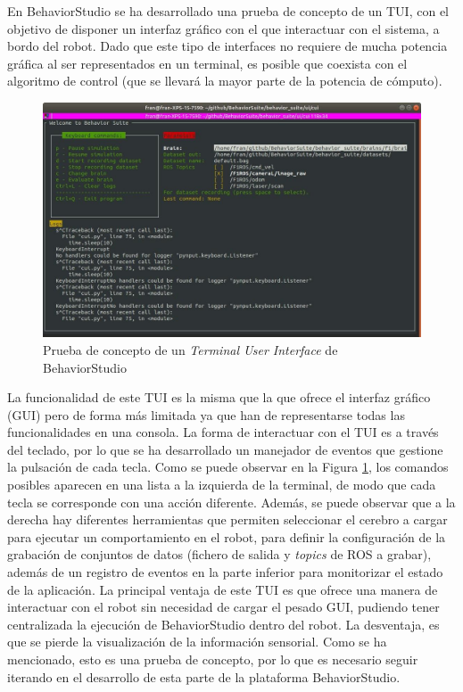 En BehaviorStudio se ha desarrollado una prueba de concepto de un TUI, con el objetivo de disponer un interfaz gráfico con el que interactuar con el sistema, a bordo del robot. Dado que este tipo de interfaces no requiere de mucha potencia gráfica al ser representados en un terminal, es posible que coexista con el algoritmo de control (que se llevará la mayor parte de la potencia de cómputo). 

\begin{figure}
  \centering
  \includegraphics[width=.8\linewidth]{img/tui.jpg}
  \caption{Prueba de concepto de un \textit{Terminal User Interface} de BehaviorStudio}
  \label{fig:tui}
\end{figure}

La funcionalidad de este TUI es la misma que la que ofrece el interfaz gráfico (GUI) pero de forma más limitada ya que han de representarse todas las funcionalidades en una consola. La forma de interactuar con el TUI es a través del teclado, por lo que se ha desarrollado un manejador de eventos que gestione la pulsación de cada tecla. Como se puede observar en la Figura \ref{fig:tui}, los comandos posibles aparecen en una lista a la izquierda de la terminal, de modo que cada tecla se corresponde con una acción diferente. Además, se puede observar que a la derecha hay diferentes herramientas que permiten seleccionar el cerebro a cargar para ejecutar un comportamiento en el robot, para definir la configuración de la grabación de conjuntos de datos (fichero de salida y \textit{topics} de ROS a grabar), además de un registro de eventos en la parte inferior para monitorizar el estado de la aplicación. La principal ventaja de este TUI es que ofrece una manera de interactuar con el robot sin necesidad de cargar el pesado GUI, pudiendo tener centralizada la ejecución de BehaviorStudio dentro del robot. La desventaja, es que se pierde la visualización de la información sensorial. Como se ha mencionado, esto es una prueba de concepto, por lo que es necesario seguir iterando en el desarrollo de esta parte de la plataforma BehaviorStudio.


